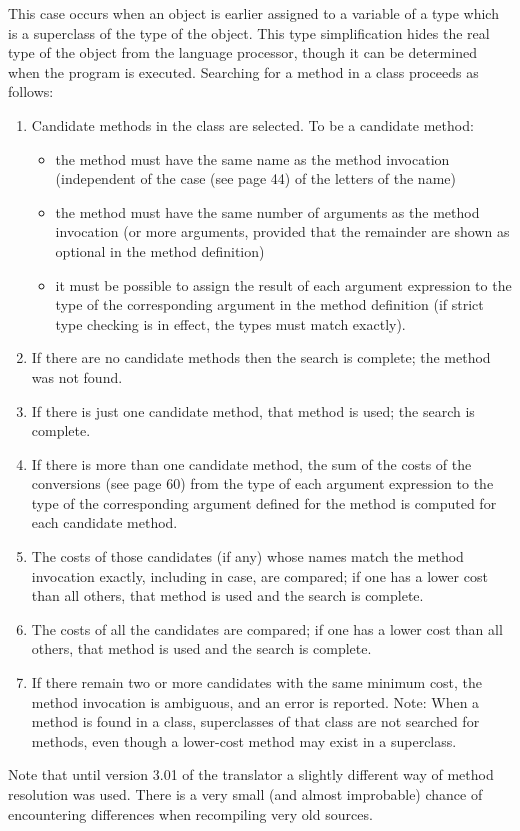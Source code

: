 This case occurs when an object is earlier assigned to a variable of a type which is a superclass of the type of the object. This type simplification hides the real type of the object from the language processor, though it can be determined when the program is executed.
Searching for a method in a class proceeds as follows:
\begin{enumerate}
\item Candidate methods in the class are selected. To be a candidate method:
 \begin{itemize}
\item the method must have the same name as the method invocation (independent of the case (see page 44) of the letters of the name)
\item the method must have the same number of arguments as the method invocation (or more arguments, provided that the remainder are shown as optional in the method definition)
\item it must be possible to assign the result of each argument expression to the type of the corresponding argument in the method definition (if strict type checking is in effect, the types must match exactly).
\end{itemize}
\item If there are no candidate methods then the search is complete; the method was not found.
\item If there is just one candidate method, that method is used; the search is complete.
\item If there is more than one candidate method, the sum of the costs of the conversions (see page 60) from the type of each argument expression to the type of the corresponding argument defined for the method is computed for each candidate method.
\item The costs of those candidates (if any) whose names match the method invocation exactly, including in case, are compared; if one has a lower cost than all others, that method is used and the search is complete.
\item The costs of all the candidates are compared; if one has a lower cost than all others, that method is used and the search is complete.
\item If there remain two or more candidates with the same minimum cost, the method invocation is ambiguous, and an error is reported.
Note: When a method is found in a class, superclasses of that class are not searched for methods, even though a lower-cost method may exist in a superclass.
\end{enumerate}

Note that until version 3.01 of the \nr{} translator a slightly different way of
method resolution was used. There is a very small (and almost improbable) chance of encountering differences when recompiling very old sources.

